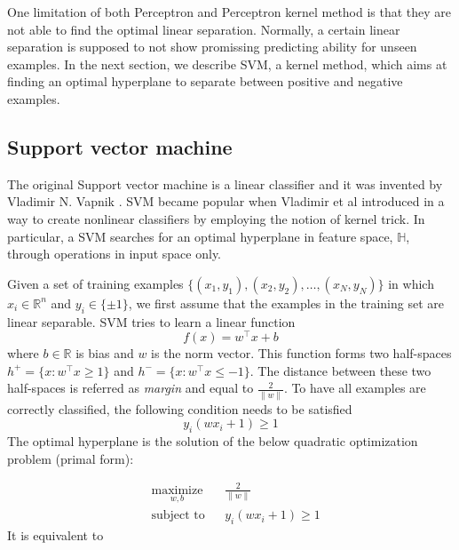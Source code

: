 One limitation of both Perceptron and Perceptron kernel method is that they are not able to find the optimal linear separation. Normally, a certain linear separation is supposed to not show promissing predicting ability for unseen examples. In the next section, we describe SVM, a kernel method, which aims at finding an optimal hyperplane to separate between positive and negative examples.

\subsection{Support vector machine}
The original Support vector machine is a linear classifier and it was invented by Vladimir N. Vapnik \cite{vapnik1963pattern}. SVM became popular when Vladimir et al introduced in \cite{boser1992training} a way to create nonlinear classifiers by employing the notion of kernel trick. In particular, a SVM searches for an optimal hyperplane in feature space, $\mathbb{H}$, through operations in input space only.

Given a set of training examples $\lbrace (x_1, y_1), (x_2, y_2),\ldots, (x_N, y_N) \rbrace$ in which $x_i \in \mathbb{R}^n$ and $y_i \in \lbrace \pm 1 \rbrace$, we first assume that the examples in the training set are linear separable. SVM tries to learn a linear function
\begin{equation}
\label{decision_svm}
f(x) = w^\intercal x + b
\end{equation}
where $b\in \mathbb{R}$ is bias and $w$ is the norm vector. This function forms two half-spaces $h^+ = \lbrace x: w^\intercal x \geq 1\rbrace$ and $h^- = \lbrace x: w^\intercal x \leq -1\rbrace$. The distance between these two half-spaces is referred as \textit{margin} and equal to $\frac{2}{\parallel w \parallel}$. To have all examples are correctly classified, the following condition needs to be satisfied 
\begin{equation}
\label{condition_svm}
y_i(wx_i + 1) \geq 1
\end{equation}
The optimal hyperplane is the solution of the below quadratic optimization problem (primal form):

\begin{equation}
\begin{aligned}
& \underset{w,b}{\text{maximize}}
& & \frac{2}{\| w \|} \\
& \text{subject to}
& & y_i(wx_i + 1) \geq 1
\end{aligned}
\end{equation}
It is equivalent to 

